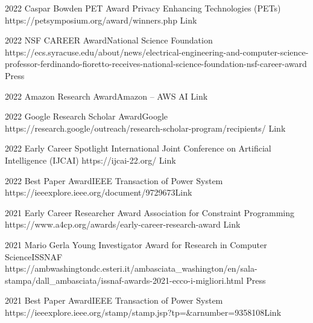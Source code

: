 \documentclass[localFont,alternative]{metadataShortBio}
\begin{document}
\vspace{-2pt}
\vspace{-6pt}

\begin{awards}
	\awardentry
	{2022}
	{Caspar Bowden PET Award}%
	{Privacy Enhancing Technologies (PETs)}
	{https://petsymposium.org/award/winners.php}
	{Link}

	\awardentry
	{2022}
	{NSF CAREER Award}{National Science Foundation}
	{https://ecs.syracuse.edu/about/news/electrical-engineering-and-computer-science-professor-ferdinando-fioretto-receives-national-science-foundation-nsf-career-award}
	{Press}

	\awardentry
	{2022}
	{Amazon Research Award}{Amazon -- AWS AI}
	{}
	{Link}

	\awardentry
	{2022}
	{Google Research Scholar Award}{Google}
	{https://research.google/outreach/research-scholar-program/recipients/}
	{Link}

	\awardentry
	{2022}
	{Early Career Spotlight}%
	{International Joint Conference on Artificial Intelligence (IJCAI)}
	{https://ijcai-22.org/}
	{Link}

	\awardentry
	{2022}
	{Best Paper Award}{IEEE Transaction of Power System}
	{https://ieeexplore.ieee.org/document/9729673}{Link}

	\awardentry
	{2021}
	{Early Career Researcher Award}
	{Association for Constraint Programming}
	{https://www.a4cp.org/awards/early-career-research-award}
	{Link}

	\awardentry
	{2021}
	{Mario Gerla Young Investigator Award for Research in Computer Science}{ISSNAF}
	{https://ambwashingtondc.esteri.it/ambasciata_washington/en/sala-stampa/dall_ambasciata/issnaf-awards-2021-ecco-i-migliori.html}
	{Press}

		
	\awardentry
	{2021}
	{Best Paper Award}{IEEE Transaction of Power System}
	{https://ieeexplore.ieee.org/stamp/stamp.jsp?tp=\&arnumber=9358108}{Link}


\end{awards}
\end{document}
